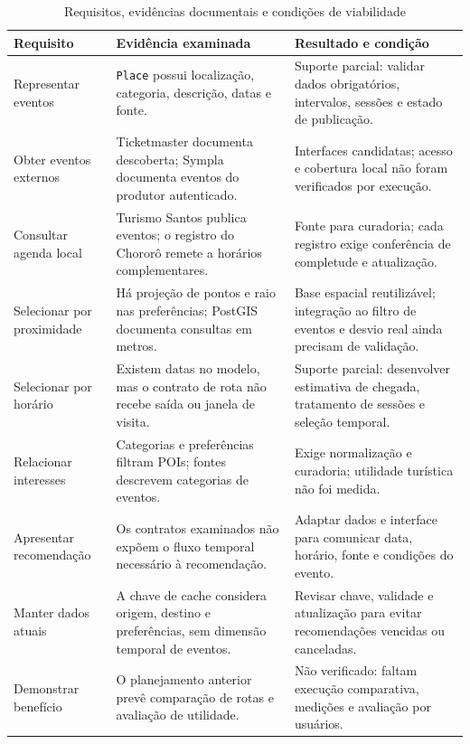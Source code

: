 \begin{table}[H]
\centering
\caption{Requisitos, evidências documentais e condições de viabilidade}
\label{tab:matriz-viabilidade}
\small
\setlength{\tabcolsep}{4pt}
\renewcommand{\arraystretch}{1.16}
\begin{tabular}{@{}>{\raggedright\arraybackslash}p{3.0cm}>{\raggedright\arraybackslash}p{6.0cm}>{\raggedright\arraybackslash}p{6.4cm}@{}}
\toprule
\textbf{Requisito} & \textbf{Evidência examinada} & \textbf{Resultado e condição} \\
\midrule
Representar eventos & \texttt{Place} possui localização, categoria, descrição, datas e fonte. & Suporte parcial: validar dados obrigatórios, intervalos, sessões e estado de publicação. \\[0.12cm]
Obter eventos externos & Ticketmaster documenta descoberta; Sympla documenta eventos do produtor autenticado. & Interfaces candidatas; acesso e cobertura local não foram verificados por execução. \\[0.12cm]
Consultar agenda local & Turismo Santos publica eventos; o registro do Chororô remete a horários complementares. & Fonte para curadoria; cada registro exige conferência de completude e atualização. \\[0.12cm]
Selecionar por proximidade & Há projeção de pontos e raio nas preferências; PostGIS documenta consultas em metros. & Base espacial reutilizável; integração ao filtro de eventos e desvio real ainda precisam de validação. \\[0.12cm]
Selecionar por horário & Existem datas no modelo, mas o contrato de rota não recebe saída ou janela de visita. & Suporte parcial: desenvolver estimativa de chegada, tratamento de sessões e seleção temporal. \\[0.12cm]
Relacionar interesses & Categorias e preferências filtram POIs; fontes descrevem categorias de eventos. & Exige normalização e curadoria; utilidade turística não foi medida. \\[0.12cm]
Apresentar recomendação & Os contratos examinados não expõem o fluxo temporal necessário à recomendação. & Adaptar dados e interface para comunicar data, horário, fonte e condições do evento. \\[0.12cm]
Manter dados atuais & A chave de cache considera origem, destino e preferências, sem dimensão temporal de eventos. & Revisar chave, validade e atualização para evitar recomendações vencidas ou canceladas. \\[0.12cm]
Demonstrar benefício & O planejamento anterior prevê comparação de rotas e avaliação de utilidade. & Não verificado: faltam execução comparativa, medições e avaliação por usuários. \\
\bottomrule
\end{tabular}
\end{table}

